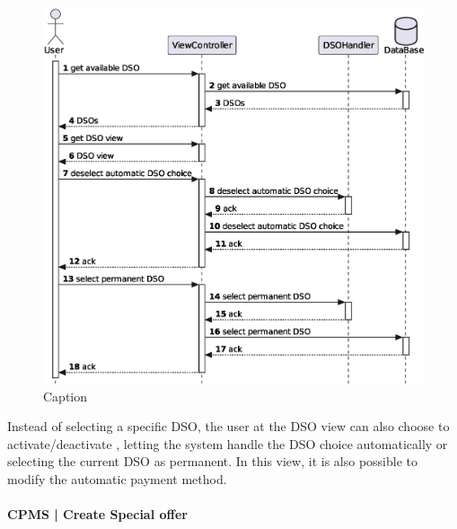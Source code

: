 \begin{figure}[h!]
    \centering
    \includegraphics[width=0.85\columnwidth]{./images/diagrams/sequences/cpms/DSO}
    \caption{Caption}
\end{figure}

Instead of selecting a specific DSO, the user at the DSO view can also choose to activate/deactivate , letting the system handle the DSO choice automatically or selecting the current DSO as permanent. In this view, it is also possible to modify the automatic payment method.

\pagebreak

\paragraph{CPMS | Create Special offer}

